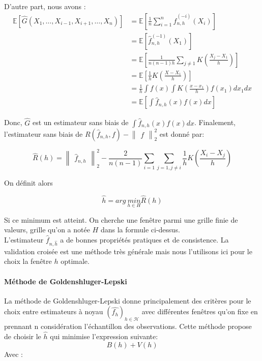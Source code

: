 \documentclass[
]{article}
\begin{document}
D'autre part, nous avons : \[ 
\begin{aligned}
\mathbb{E}[\hat{G}(X_1,\dots,X_{i-1},X_{i+1},\dots,X_n)]&=\mathbb{E}[\frac{1}{n}\sum_{i=1}^n\hat{f}_{n,h}^{(-i)}(X_i)]\\
&=\mathbb{E}[\hat{f}_{n,h}^{(-1)}(X_1)]\\
&=\mathbb{E}[\frac{1}{n(n-1)h}\sum_{j\ne 1}K(\frac{X_j-X_1}{h})]\\
&=\mathbb{E}[\frac{1}{h}K(\frac{X-X_1}{h})]\\
&=\frac{1}{h}\int f(x)\int K(\frac{x-x_1}{h})f(x_1)dx_1dx\\
&=\mathbb{E}[\int \hat{f}_{n,h}(x)f(x)dx] 
\end{aligned}
\]

Donc, \(\hat{G}\) est un estimateur sans biais de
\(\int\hat{f}_{n,h}(x)f(x)dx\). Finalement, l'estimateur sans biais de
\(R(\hat{f}_{n,h}, f)-\begin{Vmatrix}{f}\end{Vmatrix}_2^2\) est donné
par:

\[
\hat{R}(h)=\begin{Vmatrix}\hat{f}_{n,h}\end{Vmatrix}_2^2-\frac{2}{n(n-1)}\sum_{i=1}\sum_{j=1,j\ne i}\frac{1}{h}K(\frac{X_i-X_j}{h})
\]

On définit alors

\[
\hat{h} = arg\ \underset{h\in H}{min}\hat{R}(h)
\]

Si ce minimum est atteint. On cherche une fenêtre parmi une grille finie
de valeurs, grille qu'on a notée \(H\) dans la formule ci-dessus.\\
L'estimateur \(\hat{f}_{n,\hat{h}}\) a de bonnes propriétés pratiques et
de consistence. La validation croisée est une méthode très générale mais
nous l'utilisons ici pour le choix la fenêtre \(h\) optimale.

\paragraph{Méthode de Goldenshluger-Lepski}

La méthode de Goldenshluger-Lepski donne principalement des critères
pour le choix entre estimateurs à noyau
\((\hat{f_h})_{h\in \mathcal H}\) avec différentes fenêtres qu'on fixe
en prennant n considération l'échantillon des observations.\newline
Cette méthode propose de choisir le \(\hat h\) qui minimise l'expression
suivante: \[
B(h)+V(h)
\] Avec :
\end{document}

